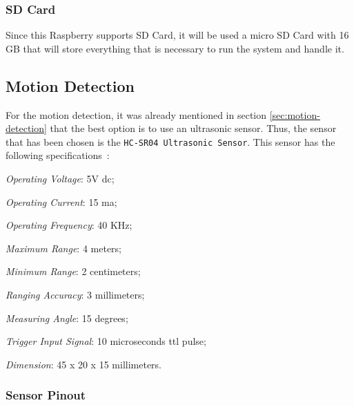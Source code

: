 \subsubsection{SD Card}

Since this Raspberry supports SD Card, it will be used a micro SD Card with 16 GB that will store everything that is necessary to run the system and handle it.

\subsection{Motion Detection}
\label{sec:motion-detec}

For the motion detection, it was already mentioned in section \ref{sec:motion-detection} that the best option is to use an ultrasonic sensor. Thus, the sensor that has been chosen is the \texttt{HC-SR04 Ultrasonic Sensor}. This sensor has the following specifications~\cite{sensor}:
%
\begin{item-c}
\item \emph{Operating Voltage}: 5V \gls{dc};
\item \emph{Operating Current}: 15 \gls{ma};
\item \emph{Operating Frequency}: 40 KHz;
\item \emph{Maximum Range}: 4 meters;
\item \emph{Minimum Range}: 2 centimeters;
\item \emph{Ranging Accuracy}: 3 millimeters;
\item \emph{Measuring Angle}: 15 degrees;
\item \emph{Trigger Input Signal}: 10 microseconds \gls{ttl} pulse;
\item \emph{Dimension}: 45 x 20 x 15 millimeters.
\end{item-c}

\subsubsection{Sensor Pinout}

